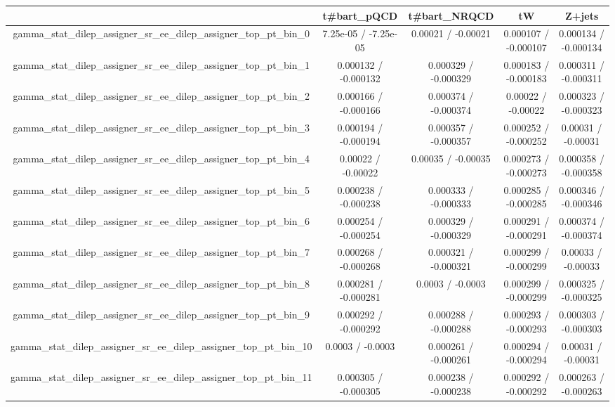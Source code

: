 \documentclass[10pt]{article}
\begin{document}
\begin{table}[htbp]
\begin{center}
\begin{tabular}{|c|c|c|c|c|}
\hline 
      & t#bar{t}_{pQCD}      & t#bar{t}_{NRQCD}      & tW      & Z+jets \\ 
\hline 
  gamma_stat_dilep_assigner_sr_ee_dilep_assigner_top_pt_bin_0 & 7.25e-05 / -7.25e-05 & 0.00021 / -0.00021 & 0.000107 / -0.000107 & 0.000134 / -0.000134 \\ 
  gamma_stat_dilep_assigner_sr_ee_dilep_assigner_top_pt_bin_1 & 0.000132 / -0.000132 & 0.000329 / -0.000329 & 0.000183 / -0.000183 & 0.000311 / -0.000311 \\ 
  gamma_stat_dilep_assigner_sr_ee_dilep_assigner_top_pt_bin_2 & 0.000166 / -0.000166 & 0.000374 / -0.000374 & 0.00022 / -0.00022 & 0.000323 / -0.000323 \\ 
  gamma_stat_dilep_assigner_sr_ee_dilep_assigner_top_pt_bin_3 & 0.000194 / -0.000194 & 0.000357 / -0.000357 & 0.000252 / -0.000252 & 0.00031 / -0.00031 \\ 
  gamma_stat_dilep_assigner_sr_ee_dilep_assigner_top_pt_bin_4 & 0.00022 / -0.00022 & 0.00035 / -0.00035 & 0.000273 / -0.000273 & 0.000358 / -0.000358 \\ 
  gamma_stat_dilep_assigner_sr_ee_dilep_assigner_top_pt_bin_5 & 0.000238 / -0.000238 & 0.000333 / -0.000333 & 0.000285 / -0.000285 & 0.000346 / -0.000346 \\ 
  gamma_stat_dilep_assigner_sr_ee_dilep_assigner_top_pt_bin_6 & 0.000254 / -0.000254 & 0.000329 / -0.000329 & 0.000291 / -0.000291 & 0.000374 / -0.000374 \\ 
  gamma_stat_dilep_assigner_sr_ee_dilep_assigner_top_pt_bin_7 & 0.000268 / -0.000268 & 0.000321 / -0.000321 & 0.000299 / -0.000299 & 0.00033 / -0.00033 \\ 
  gamma_stat_dilep_assigner_sr_ee_dilep_assigner_top_pt_bin_8 & 0.000281 / -0.000281 & 0.0003 / -0.0003 & 0.000299 / -0.000299 & 0.000325 / -0.000325 \\ 
  gamma_stat_dilep_assigner_sr_ee_dilep_assigner_top_pt_bin_9 & 0.000292 / -0.000292 & 0.000288 / -0.000288 & 0.000293 / -0.000293 & 0.000303 / -0.000303 \\ 
  gamma_stat_dilep_assigner_sr_ee_dilep_assigner_top_pt_bin_10 & 0.0003 / -0.0003 & 0.000261 / -0.000261 & 0.000294 / -0.000294 & 0.00031 / -0.00031 \\ 
  gamma_stat_dilep_assigner_sr_ee_dilep_assigner_top_pt_bin_11 & 0.000305 / -0.000305 & 0.000238 / -0.000238 & 0.000292 / -0.000292 & 0.000263 / -0.000263 \\ 

\end{tabular}
\end{center}
\end{table}
\end{document}
